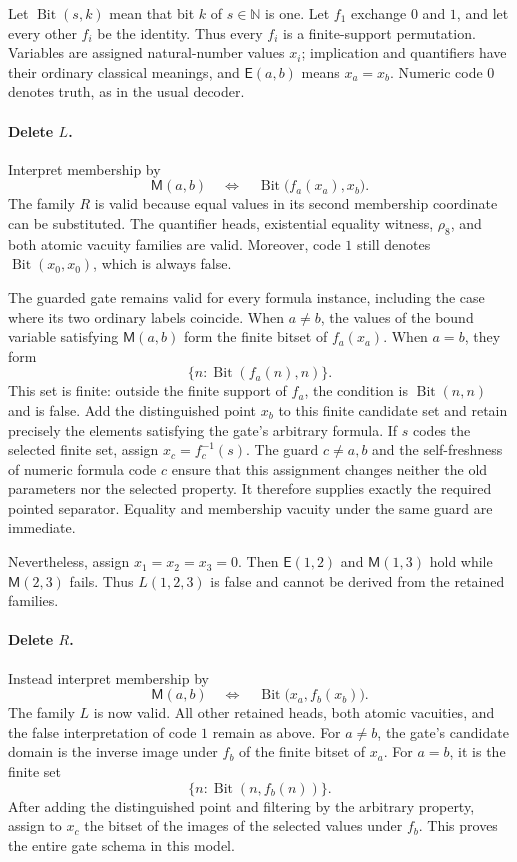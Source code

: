 Let $\operatorname{Bit}(s,k)$ mean that bit $k$ of $s\in\mathbb N$ is one.
Let $f_1$ exchange $0$ and $1$, and let every other $f_i$ be the identity.
Thus every $f_i$ is a finite-support permutation.  Variables are assigned
natural-number values $x_i$; implication and quantifiers have their
ordinary classical meanings, and
$\mathsf E(a,b)$ means $x_a=x_b$.  Numeric code $0$ denotes truth, as in
the usual decoder.

\paragraph{Delete $L$.}
Interpret membership by
\[
 \mathsf M(a,b)\quad\Longleftrightarrow\quad
 \operatorname{Bit}\bigl(f_a(x_a),x_b\bigr).
 \tag{L-model}
\]
The family $R$ is valid because equal values in its second membership
coordinate can be substituted.  The quantifier heads, existential
equality witness, $\rho_8$, and both atomic vacuity families are valid.
Moreover, code $1$ still denotes
$\operatorname{Bit}(x_0,x_0)$, which is always false.

The guarded gate remains valid for every formula instance, including the
case where its two ordinary labels coincide.  When $a\ne b$, the values
of the bound variable satisfying $\mathsf M(a,b)$ form the finite bitset
of $f_a(x_a)$.  When $a=b$, they form
\[
 \{n:\operatorname{Bit}(f_a(n),n)\}.
\]
This set is finite: outside the finite support of $f_a$, the condition is
$\operatorname{Bit}(n,n)$ and is false.  Add the distinguished point
$x_b$ to this finite candidate set and retain precisely the elements
satisfying the gate's arbitrary formula.  If $s$ codes the selected
finite set, assign $x_c=f_c^{-1}(s)$.  The guard $c\ne a,b$ and the
self-freshness of numeric formula code $c$ ensure that this assignment
changes neither the old parameters nor the selected property.  It
therefore supplies exactly the required pointed separator.  Equality
and membership vacuity under the same guard are immediate.

Nevertheless, assign $x_1=x_2=x_3=0$.  Then $\mathsf E(1,2)$ and
$\mathsf M(1,3)$ hold while $\mathsf M(2,3)$ fails.  Thus $L(1,2,3)$ is
false and cannot be derived from the retained families.

\paragraph{Delete $R$.}
Instead interpret membership by
\[
 \mathsf M(a,b)\quad\Longleftrightarrow\quad
 \operatorname{Bit}\bigl(x_a,f_b(x_b)\bigr).
 \tag{R-model}
\]
The family $L$ is now valid.  All other retained heads, both atomic
vacuities, and the false interpretation of code $1$ remain as above.
For $a\ne b$, the gate's candidate domain is the inverse image under
$f_b$ of the finite bitset of $x_a$.  For $a=b$, it is the finite set
\[
 \{n:\operatorname{Bit}(n,f_b(n))\}.
\]
After adding the distinguished point and filtering by the arbitrary
property, assign to $x_c$ the bitset of the images of the selected values
under $f_b$.  This proves the entire gate schema in this model.

